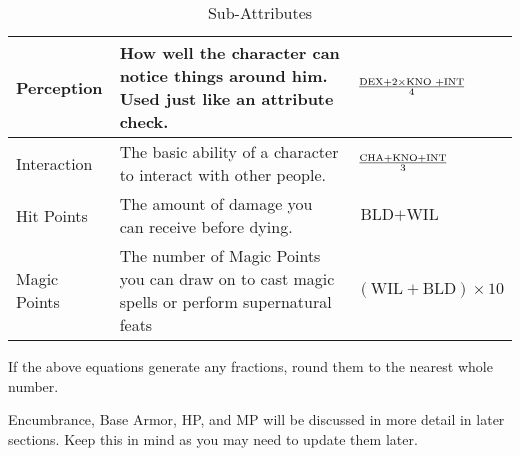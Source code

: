 \documentclass[twoside]{book}
\begin{document}
\begin{table}[htb]
\begin{center}
\begin{tabular}{|p{1in}|p{3in}|p{1.5in}|}
\hline

 Perception & How well the character can notice things
                     around him. Used just like an attribute check.
                     &  \begin{math}  {{  \textrm{DEX} +
                        2  \times    \textrm{KNO
                    } +   \textrm{INT}  }\over{ 4
                     }}  \end{math}
                  \\

\hline

 Interaction & The basic ability of a character to interact
                     with other people. &  \begin{math}  {{\textrm{CHA} +
                     \textrm{KNO} + \textrm{INT}}\over{ 3 }}  \end{math}
                  \\

\hline

 Hit Points & The amount of damage you can receive before
                     dying. &  \begin{math}\textrm{BLD} + \textrm{WIL
                    }\end{math}
                  \\

\hline

 Magic Points & The number of Magic Points you can draw on to
                     cast magic spells or perform supernatural feats
                     &  \begin{math}     (   \textrm{WIL} 
                      +   \textrm{BLD}   )   
                     \times     10     \end{math}
                  \\

\hline


  \end{tabular}
  
\caption{Sub-Attributes}
  
  \end{center}
\end{table}
  
    {  
     If the above equations generate any fractions, round
               them to the nearest whole number. 
    }
  
    {  
     Encumbrance, Base Armor, HP, and MP will be
               discussed in more detail in later sections. Keep this in
               mind as you may need to update them later. 
    }
  
\end{document}
